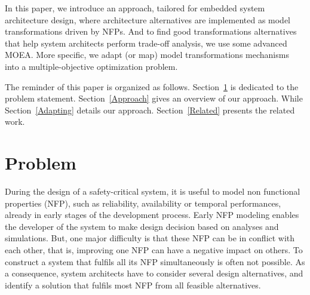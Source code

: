 \documentclass[conference]{IEEEtran}
\begin{document}
In this paper, we introduce an approach, tailored for embedded system architecture design, where architecture alternatives are implemented as model transformations driven by NFPs. And to find good transformations alternatives that help system architects perform trade-off analysis, we use some advanced MOEA. More specific, we adapt (or map) model transformations mechanisms into a multiple-objective optimization problem.


The reminder of this paper is organized as follows. Section~\ref{Problem} is dedicated to the problem statement. Section~\ref{Approach} gives an overview  of our approach. While Section~\ref{Adapting} details our approach. Section~\ref{Related} presents the related work.

\section{Problem}
\label{Problem}
During the design of a safety-critical system, it is useful to model non functional properties (NFP), such as reliability, availability or temporal performances, already in early stages of the development process. Early NFP modeling enables the developer of the system to make design decision based on analyses and simulations. But, one major difficulty is that these NFP can be in conflict with each other, that is, improving one NFP can have a negative impact on others. To construct a system that fulfils all its NFP simultaneously is often not possible. As a consequence, system architects have to consider several design alternatives, and identify a solution that fulfils most NFP from all feasible alternatives. 
\end{document}
